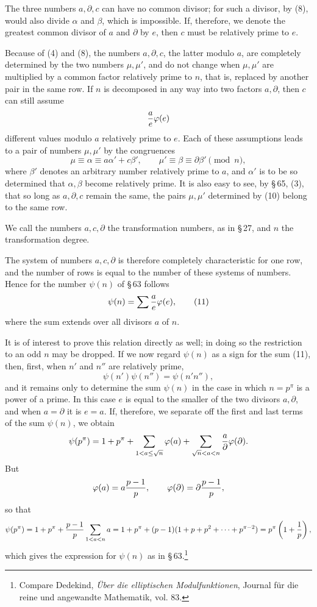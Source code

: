 \documentclass[11pt]{article}
\begin{document}
The three numbers $a,\partial,c$ can have no common divisor; for such a divisor, by (8), would also divide $\alpha$ and $\beta$, which is impossible. If, therefore, we denote the greatest common divisor of $a$ and $\partial$ by $e$, then $c$ must be relatively prime to $e$.

Because of (4) and (8), the numbers $a,\partial,c$, the latter modulo $a$, are completely determined by the two numbers $\mu,\mu'$, and do not change when $\mu,\mu'$ are multiplied by a common factor relatively prime to $n$, that is, replaced by another pair in the same row. If $n$ is decomposed in any way into two factors $a,\partial$, then $c$ can still assume
\[
{a\over e}\varphi(e)
\]
different values modulo $a$ relatively prime to $e$. Each of these assumptions leads to a pair of numbers $\mu,\mu'$ by the congruences
\begin{equation}
\mu\equiv\alpha\equiv a\alpha'+c\beta',
\qquad
\mu'\equiv\beta\equiv\partial\beta'\pmod n,
\tag{10}
\end{equation}
where $\beta'$ denotes an arbitrary number relatively prime to $a$, and $\alpha'$ is to be so determined that $\alpha,\beta$ become relatively prime. It is also easy to see, by \S\,65, (3), that so long as $a,\partial,c$ remain the same, the pairs $\mu,\mu'$ determined by (10) belong to the same row.

We call the numbers $a,c,\partial$ the transformation numbers, as in \S\,27, and $n$ the transformation degree.

The system of numbers $a,c,\partial$ is therefore completely characteristic for one row, and the number of rows is equal to the number of these systems of numbers. Hence for the number $\psi(n)$ of \S\,63 follows
\begin{equation}
\psi(n)=\sum {a\over e}\varphi(e),
\tag{11}
\end{equation}
where the sum extends over all divisors $a$ of $n$.

It is of interest to prove this relation directly as well; in doing so the restriction to an odd $n$ may be dropped. If we now regard $\psi(n)$ as a sign for the sum (11), then, first, when $n'$ and $n''$ are relatively prime,
\[
\psi(n')\psi(n'')=\psi(n'n''),
\]
and it remains only to determine the sum $\psi(n)$ in the case in which $n=p^\pi$ is a power of a prime. In this case $e$ is equal to the smaller of the two divisors $a,\partial$, and when $a=\partial$ it is $e=a$. If, therefore, we separate off the first and last terms of the sum $\psi(n)$, we obtain
\[
\psi(p^\pi)=1+p^\pi+
\sum_{1<a\le\sqrt n}\varphi(a)+
\sum_{\sqrt n<a<n}{a\over\partial}\varphi(\partial).
\]
But
\[
\varphi(a)=a{p-1\over p},
\qquad
\varphi(\partial)=\partial{p-1\over p},
\]
so that
\[
\psi(p^\pi)=1+p^\pi+{p-1\over p}\sum_{1<a<n}a
=1+p^\pi+(p-1)(1+p+p^2+\cdots+p^{\pi-2})=p^\pi\left(1+{1\over p}\right),
\]
which gives the expression for $\psi(n)$ as in \S\,63.\footnote{Compare Dedekind, \emph{Über die elliptischen Modulfunktionen}, Journal für die reine und angewandte Mathematik, vol. 83.}
\end{document}
